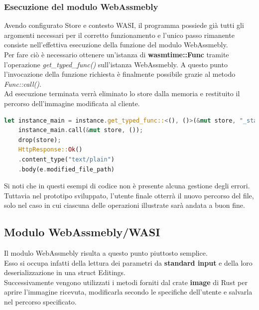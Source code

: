 \subsubsection{Esecuzione del modulo WebAssmebly}
Avendo configurato Store e contesto WASI, il programma possiede già tutti gli argomenti necessari per il corretto funzionamento e l'unico passo rimanente consiste nell'effettiva esecuzione della funzione del modulo WebAssmebly.
\\Per fare ciò è  necessario ottenere un'istanza di \textbf{wasmtime::Func} tramite l'operazione \emph{get\_typed\_func()} sull'istanza WebAssmebly.
A questo punto l'invocazione della funzione richiesta è finalmente possibile grazie al metodo \emph{Func::call()}.
\\Ad esecuzione terminata verrà eliminato lo store dalla memoria e restituito il percorso dell'immagine modificata al cliente.
\begin{lstlisting}[language=rust,caption={File handlers.rs: invocazione funzione \_start presente nel modulo Wasm}, showstringspaces=false]
    let instance_main = instance.get_typed_func::<(), ()>(&mut store, "_start");
    instance_main.call(&mut store, ());
    drop(store);
    HttpResponse::Ok()
    .content_type("text/plain")
    .body(e.modified_file_path)
\end{lstlisting}
Si noti che in questi esempi di codice non è presente alcuna gestione degli errori. Tuttavia nel prototipo sviluppato, l'utente finale otterrà il nuovo percorso del file, solo nel caso in cui ciascuna delle operazioni illustrate sarà andata a buon fine.
\newpage
\subsection{Modulo WebAssmebly/WASI}
Il modulo WebAssmebly risulta a questo punto piuttosto semplice.
\\Esso si occupa infatti della lettura dei parametri da \textbf{standard input} e della loro deserializzazione in una struct Editings.
\\Successivamente vengono utilizzati i metodi forniti dal crate \textbf{image} di Rust per aprire l'immagine ricevuta, modificarla secondo le specifiche dell'utente e salvarla nel percorso specificato.\cite{rust:image}

